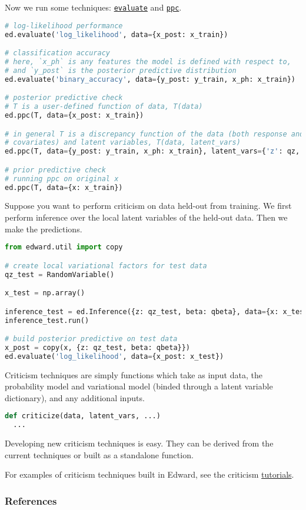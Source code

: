 Now we run some techniques:
\href{/tutorials/point-evaluation}{\texttt{evaluate}}
and
\href{/tutorials/ppc}{\texttt{ppc}}.

\begin{lstlisting}[language=Python]
# log-likelihood performance
ed.evaluate('log_likelihood', data={x_post: x_train})

# classification accuracy
# here, `x_ph` is any features the model is defined with respect to,
# and `y_post` is the posterior predictive distribution
ed.evaluate('binary_accuracy', data={y_post: y_train, x_ph: x_train})

# posterior predictive check
# T is a user-defined function of data, T(data)
ed.ppc(T, data={x_post: x_train})

# in general T is a discrepancy function of the data (both response and
# covariates) and latent variables, T(data, latent_vars)
ed.ppc(T, data={y_post: y_train, x_ph: x_train}, latent_vars={'z': qz, 'beta': qbeta})

# prior predictive check
# running ppc on original x
ed.ppc(T, data={x: x_train})
\end{lstlisting}

Suppose you want to perform criticism on data held-out from training.
We first perform inference over the local latent variables of the
held-out data. Then we make the predictions.

\begin{lstlisting}[language=Python]
from edward.util import copy

# create local variational factors for test data
qz_test = RandomVariable()

x_test = np.array()

inference_test = ed.Inference({z: qz_test, beta: qbeta}, data={x: x_test})
inference_test.run()

# build posterior predictive on test data
x_post = copy(x, {z: qz_test, beta: qbeta}})
ed.evaluate('log_likelihood', data={x_post: x_test})
\end{lstlisting}

Criticism techniques are simply functions which take as input data,
the probability model and variational model (binded through a latent
variable dictionary), and any additional inputs.

\begin{lstlisting}[language=Python]
def criticize(data, latent_vars, ...)
  ...
\end{lstlisting}

Developing new criticism techniques is easy.  They can be derived from
the current techniques or built as a standalone function.

For examples of criticism techniques built in Edward, see the
criticism
\href{/tutorials/}{tutorials}.

\subsubsection{References}\label{references}
